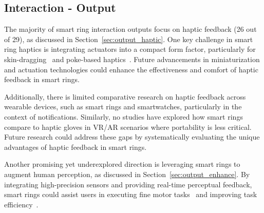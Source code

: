 \subsection{Interaction - Output}

The majority of smart ring interaction outputs focus on haptic feedback (26 out of 29), as discussed in Section~\ref{sec:output_haptic}. One key challenge in smart ring haptics is integrating actuators into a compact form factor, particularly for skin-dragging~\cite{je2017designing, je2017tactoring} and poke-based haptics~\cite{je2018pokering}. Future advancements in miniaturization and actuation technologies could enhance the effectiveness and comfort of haptic feedback in smart rings. 

Additionally, there is limited comparative research on haptic feedback across wearable devices, such as smart rings and smartwatches, particularly in the context of notifications. Similarly, no studies have explored how smart rings compare to haptic gloves in VR/AR scenarios where portability is less critical. Future research could address these gaps by systematically evaluating the unique advantages of haptic feedback in smart rings. 

Another promising yet underexplored direction is leveraging smart rings to augment human perception, as discussed in Section~\ref{sec:output_enhance}. By integrating high-precision sensors and providing real-time perceptual feedback, smart rings could assist users in executing fine motor tasks~\cite{obushi2019magnifinger} and improving task efficiency~\cite{wang2012portable}.




